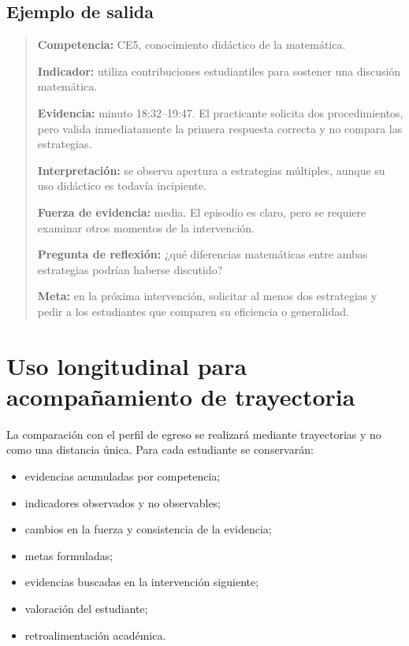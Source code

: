 \documentclass[11pt,a4paper]{article}
\begin{document}
\subsection{Ejemplo de salida}

\begin{quote}
\textbf{Competencia:} CE5, conocimiento didáctico de la matemática.

\textbf{Indicador:} utiliza contribuciones estudiantiles para sostener una discusión matemática.

\textbf{Evidencia:} minuto 18:32--19:47. El practicante solicita dos procedimientos, pero valida inmediatamente la primera respuesta correcta y no compara las estrategias.

\textbf{Interpretación:} se observa apertura a estrategias múltiples, aunque su uso didáctico es todavía incipiente.

\textbf{Fuerza de evidencia:} media. El episodio es claro, pero se requiere examinar otros momentos de la intervención.

\textbf{Pregunta de reflexión:} ¿qué diferencias matemáticas entre ambas estrategias podrían haberse discutido?

\textbf{Meta:} en la próxima intervención, solicitar al menos dos estrategias y pedir a los estudiantes que comparen su eficiencia o generalidad.
\end{quote}

\section{Uso longitudinal para acompañamiento de trayectoria}

La comparación con el perfil de egreso se realizará mediante trayectorias y no como una distancia única. Para cada estudiante se conservarán:

\begin{itemize}
    \item evidencias acumuladas por competencia;
    \item indicadores observados y no observables;
    \item cambios en la fuerza y consistencia de la evidencia;
    \item metas formuladas;
    \item evidencias buscadas en la intervención siguiente;
    \item valoración del estudiante;
    \item retroalimentación académica.
\end{itemize}
\end{document}
